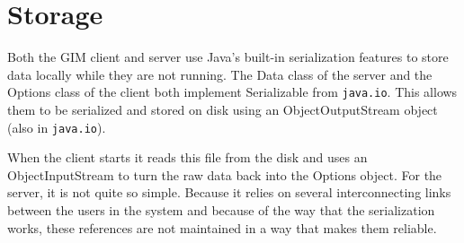 \section{Storage}
Both the GIM client and server use Java's built-in serialization features to store data locally while they are not running. The Data class of the server and the Options class of the client both implement Serializable from \texttt{java.io}. This allows them to be serialized and stored on disk using an ObjectOutputStream object (also in \texttt{java.io}).

When the client starts it reads this file from the disk and uses an ObjectInputStream to turn the raw data back into the Options object. For the server, it is not quite so simple. Because it relies on several interconnecting links between the users in the system and because of the way that the serialization works, these references are not maintained in a way that makes them reliable. 

